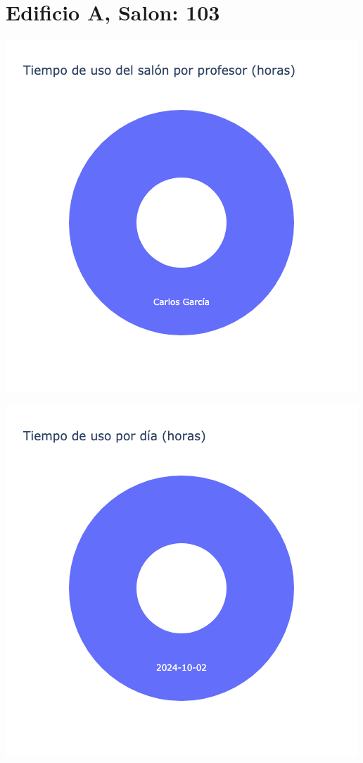 \documentclass{article}
\begin{document}
    \section{Edificio A, Salon: 103}
    \noindent
    \begin{minipage}{0.48\textwidth}
        \centering
        \includegraphics[width=\textwidth]{../img/pie/UP103-90Dias-03-12-2024.png}
    \end{minipage}
    \hfill
    \begin{minipage}{0.48\textwidth}
        \centering
        \includegraphics[width=\textwidth]{../img/pie/UD103-90Dias-03-12-2024.png}
    \end{minipage}
    
\end{document}
